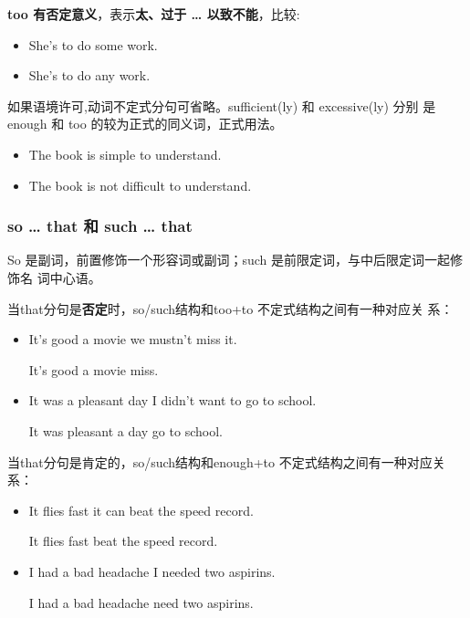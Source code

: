 \textbf{too 有否定意义}，表示\textbf{太、过于 \ldots{} 以致不能}，比较:
\begin{itemize}
\item She's  to do some work.
\item She's  to do any work.
\end{itemize}

如果语境许可,动词不定式分句可省略。sufficient(ly) 和 excessive(ly) 分别
是 enough 和 too 的较为正式的同义词，正式用法。
\begin{itemize}
\item The book is  simple to understand.
\item The book is not  difficult to understand.
\end{itemize}

\subsubsection{so \ldots{} that 和 such \ldots{} that}

So 是副词，前置修饰一个形容词或副词；such 是前限定词，与中后限定词一起修饰名
词中心语。

当that分句是\textbf{否定}时，so/such结构和too+to 不定式结构之间有一种对应关
系：
\begin{itemize}
\item It's  good a movie  we mustn't miss it.

  It's  good a movie  miss.

\item It was  a pleasant day  I didn't want to go to school.

  It was  pleasant a day  go to school.
\end{itemize}

当that分句是肯定的，so/such结构和enough+to 不定式结构之间有一种对应关系：
\begin{itemize}
\item It flies  fast  it can beat the speed record.

  It flies fast  beat the speed record.

\item I had  a bad headache  I needed two aspirins.

  I had a bad  headache  need two aspirins.
\end{itemize}


